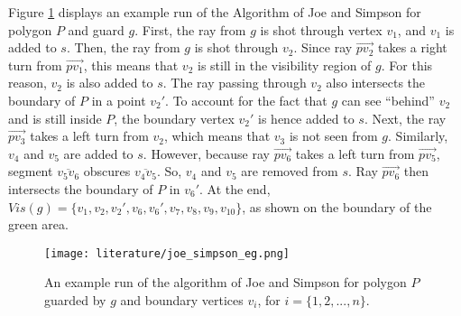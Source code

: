 Figure \ref{fig:joe} displays an example run of the Algorithm of Joe and Simpson \cite{joe1987corrections} for polygon $P$ and guard $g$. First, the ray from $g$ is shot through vertex $v_1$, and $v_1$ is added to $s$. Then, the ray from $g$ is shot through $v_2$. Since ray $\vec{pv_2}$ takes a right turn from $\vec{pv_1}$, this means that $v_2$ is still in the visibility region of $g$. For this reason, $v_2$ is also added to $s$. The ray passing through $v_2$ also intersects the boundary of $P$ in a point $v_2'$. To account for the fact that $g$ can see ``behind'' $v_2$ and is still inside $P$, the boundary vertex $v_2'$ is hence added to $s$. Next, the ray $\vec{pv_3}$ takes a left turn from $v_2$, which means that $v_3$ is not seen from $g$. Similarly, $v_4$ and $v_5$ are added to $s$. However, because ray $\vec{pv_6}$ takes a left turn from $\vec{pv_5}$, segment $\overline{v_5v_6}$ obscures $\overline{v_4v_5}$. So, $v_4$ and $v_5$ are removed from $s$. Ray $\vec{pv_6}$ then intersects the boundary of $P$ in $v_6'$. At the end, $\mathit{Vis}(g) = \{v_1, v_2, v_2', v_6, v_6', v_7, v_8, v_9, v_{10}\}$, as shown on the boundary of the green area. 

\begin{figure}[h!]
	\centering
	\texttt{[image: literature/joe\_simpson\_eg.png]}
	\caption{An example run of the algorithm of Joe and Simpson \cite{joe1987corrections} for polygon $P$ guarded by $g$ and boundary vertices $v_i$, for $i = \{1, 2, ..., n\}$.}
	\label{fig:joe}
\end{figure}


\newpage
